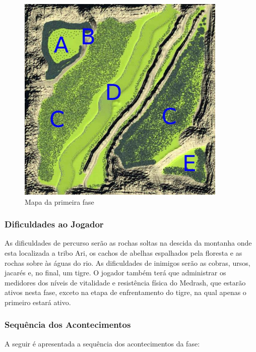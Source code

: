 \begin{figure}
\centering
\includegraphics[width=10cm]{fases_mapa_1.jpg} 
\caption{Mapa da primeira fase}
\label{fig:MapaDaFase1}
\end{figure}

\subsubsection{Dificuldades ao Jogador}

As dificuldades de percurso serão as rochas soltas na descida da montanha onde esta localizada a tribo Ari, os cachos de abelhas espalhados pela floresta e as rochas sobre às águas do rio. As dificuldades de inimigos serão as cobras, ursos, jacarés e, no final, um tigre. O jogador também terá que administrar os medidores dos níveis de vitalidade e resistência física do Medrash, que estarão ativos nesta fase, exceto na etapa de enfrentamento do tigre, na qual apenas o primeiro estará ativo.

\subsubsection{Sequência dos Acontecimentos}

A seguir é apresentada a sequência dos acontecimentos da fase:

